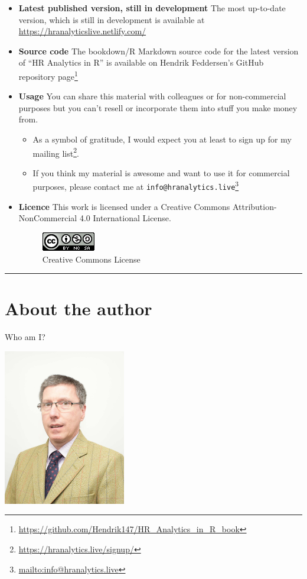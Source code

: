 \documentclass[
  12pt, krantz2,
]{krantz}
\providecommand{\tightlist}{%
  \setlength{\itemsep}{0pt}\setlength{\parskip}{0pt}}
\renewcommand{\href}[2]{#2\footnote{\url{#1}}}
\begin{document}
\begin{itemize}
\item
  \textbf{Latest published version, still in development} The most up-to-date version, which is still in development is available at \url{https://hranalyticslive.netlify.com/}
\item
  \textbf{Source code} The bookdown/R Markdown source code for the latest version of ``HR Analytics in R'' is available on Hendrik Feddersen's \href{https://github.com/Hendrik147/HR_Analytics_in_R_book}{GitHub repository page}
\item
  \textbf{Usage} You can share this material with colleagues or for non-commercial purposes but you can't resell or incorporate them into stuff you make money from.

  \begin{itemize}
  \tightlist
  \item
    As a symbol of gratitude, I would expect you at least to sign up for my \href{https://hranalytics.live/signup/}{mailing list}.
  \item
    If you think my material is awesome and want to use it for commercial purposes, please contact me at \href{mailto:info@hranalytics.live}{\nolinkurl{info@hranalytics.live}}
  \end{itemize}
\item
  \textbf{Licence} This work is licensed under a Creative Commons
  Attribution-NonCommercial 4.0 International License.

  \begin{figure}
  \centering
  \includegraphics{images/by-nc-sa.png}
  \caption{Creative Commons License}
  \end{figure}
\end{itemize}

\begin{center}\rule{0.5\linewidth}{\linethickness}\end{center}

\hypertarget{sec:about-authors}{%
\section{About the author}\label{sec:about-authors}}

Who am I?

\includegraphics[width=0.4\textwidth,height=\textheight]{images/Photo HF Snappy.jpg}
\end{document}
